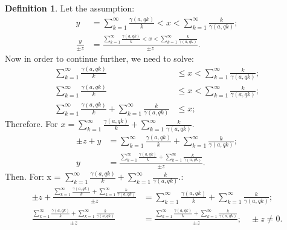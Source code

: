 \documentclass[10pt]{article}
\theoremstyle{plain}
\theoremstyle{definition}
\newtheorem{definition}[theorem]{Definition}
\theoremstyle{remark}
\begin{document}
	\begin{definition}
		Let the assumption:
		\begin{align*}
			y &= \sum_{k=1}^{\infty} \frac{\gamma(a, qk)}{k} < x < \sum_{k=1}^{\infty} \frac{k}{\gamma(a, qk)};\\
			\frac{y}{\pm z} &= \frac{\sum_{k=1}^{\infty} \frac{\gamma(a, qk)}{k} < x < \sum_{k=1}^{\infty} \frac{k}{\gamma(a, qk)}}{\pm z}.
		\end{align*}
		Now in order to continue further, we need to solve:
		\begin{align*}
			\sum_{k=1}^{\infty} \frac{\gamma(a, qk)}{k} &\leq x < \sum_{k=1}^{\infty} \frac{k}{\gamma(a, qk)};\\
			\sum_{k=1}^{\infty} \frac{\gamma(a, qk)}{k} &\leq x < \sum_{k=1}^{\infty} \frac{k}{\gamma(a, qk)};\\
			\sum_{k=1}^{\infty} \frac{\gamma(a, qk)}{k} + \sum_{k=1}^{\infty} \frac{k}{\gamma(a, qk)} &\leq x;
		\end{align*}
		Therefore. For $x = \sum_{k=1}^{\infty} \frac{\gamma(a, qk)}{k} + \sum_{k=1}^{\infty} \frac{k}{\gamma(a, qk)}.$
		\begin{align*}
			\pm z + y &= \sum_{k=1}^{\infty} \frac{\gamma(a, qk)}{k} + \sum_{k=1}^{\infty} \frac{k}{\gamma(a, qk)};\\
			y &= \frac{\sum_{k=1}^{\infty} \frac{\gamma(a, qk)}{k} + \sum_{k=1}^{\infty} \frac{k}{\gamma(a, qk)}}{\pm z}.
		\end{align*}
		Then. For: x = $\sum_{k=1}^{\infty} \frac{\gamma(a, qk)}{k} + \sum_{k=1}^{\infty} \frac{k}{\gamma(a, qk)}.$:
		\begin{align*}
			\pm z + \frac{\sum_{k=1}^{\infty} \frac{\gamma(a, qk)}{k} + \sum_{k=1}^{\infty}\frac{k}{\gamma(a, qk)}}{\pm z} &= \sum_{k=1}^{\infty} \frac{\gamma(a, qk)}{k} + \sum_{k=1}^{\infty}\frac{k}{\gamma(a, qk)};\\
			\frac{\sum_{k=1}^{\infty} \frac{\gamma(a, qk)}{k} + \sum_{k=1}^{\infty} \frac{k}{\gamma(a, qk)}}{\pm z} &= \frac{\sum_{k=1}^{\infty} \frac{\gamma(a, qk)}{k} + \sum_{k=1}^{\infty} \frac{k}{\gamma(a, qk)}}{\pm z}; \quad \pm z \neq 0.
		\end{align*}
	\end{definition}
	
\end{document}
